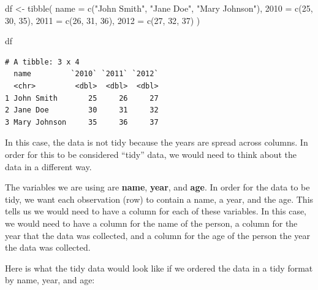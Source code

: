 \documentclass[
  letterpaper,
  DIV=11,
  numbers=noendperiod]{scrreprt}
\newenvironment{Shaded}{\begin{snugshade}}{\end{snugshade}}
\newcommand{\AttributeTok}[1]{\textcolor[rgb]{0.40,0.45,0.13}{#1}}
\newcommand{\DecValTok}[1]{\textcolor[rgb]{0.68,0.00,0.00}{#1}}
\newcommand{\FunctionTok}[1]{\textcolor[rgb]{0.28,0.35,0.67}{#1}}
\newcommand{\NormalTok}[1]{\textcolor[rgb]{0.00,0.23,0.31}{#1}}
\newcommand{\OtherTok}[1]{\textcolor[rgb]{0.00,0.23,0.31}{#1}}
\newcommand{\StringTok}[1]{\textcolor[rgb]{0.13,0.47,0.30}{#1}}
\begin{document}
\begin{Shaded}
\begin{Highlighting}[]
\NormalTok{df }\OtherTok{\textless{}{-}} \FunctionTok{tibble}\NormalTok{(}
  \AttributeTok{name =} \FunctionTok{c}\NormalTok{(}\StringTok{"John Smith"}\NormalTok{, }\StringTok{"Jane Doe"}\NormalTok{, }\StringTok{"Mary Johnson"}\NormalTok{),}
  \StringTok{\textasciigrave{}}\AttributeTok{2010}\StringTok{\textasciigrave{}} \OtherTok{=} \FunctionTok{c}\NormalTok{(}\DecValTok{25}\NormalTok{, }\DecValTok{30}\NormalTok{, }\DecValTok{35}\NormalTok{),}
  \StringTok{\textasciigrave{}}\AttributeTok{2011}\StringTok{\textasciigrave{}} \OtherTok{=} \FunctionTok{c}\NormalTok{(}\DecValTok{26}\NormalTok{, }\DecValTok{31}\NormalTok{, }\DecValTok{36}\NormalTok{),}
  \StringTok{\textasciigrave{}}\AttributeTok{2012}\StringTok{\textasciigrave{}} \OtherTok{=} \FunctionTok{c}\NormalTok{(}\DecValTok{27}\NormalTok{, }\DecValTok{32}\NormalTok{, }\DecValTok{37}\NormalTok{)}
\NormalTok{)}

\NormalTok{df}
\end{Highlighting}
\end{Shaded}

\begin{verbatim}
# A tibble: 3 x 4
  name         `2010` `2011` `2012`
  <chr>         <dbl>  <dbl>  <dbl>
1 John Smith       25     26     27
2 Jane Doe         30     31     32
3 Mary Johnson     35     36     37
\end{verbatim}

In this case, the data is not tidy because the years are spread across
columns. In order for this to be considered ``tidy'' data, we would need
to think about the data in a different way.

The variables we are using are \textbf{name}, \textbf{year}, and
\textbf{age}. In order for the data to be tidy, we want each observation
(row) to contain a name, a year, and the age. This tells us we would
need to have a column for each of these variables. In this case, we
would need to have a column for the name of the person, a column for the
year that the data was collected, and a column for the age of the person
the year the data was collected.

Here is what the tidy data would look like if we ordered the data in a
tidy format by name, year, and age:
\end{document}
